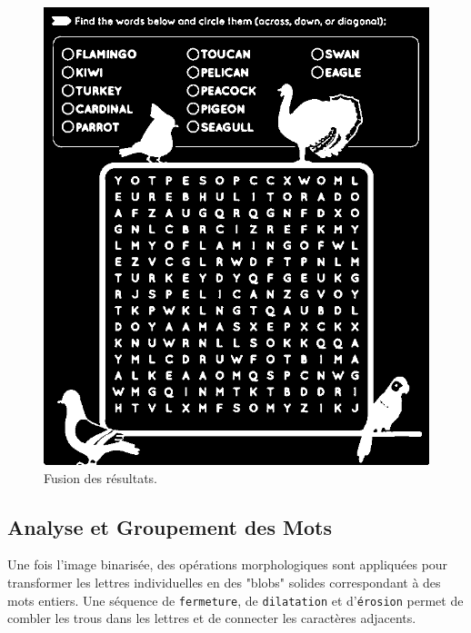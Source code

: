 \documentclass{article}
\begin{document}
\begin{figure}[H]
    \includegraphics[width=\linewidth]{ressources/3level_3_image_2_06_combined_threshold.png}
    \caption{}
  \endminipage
  \caption{Fusion des résultats.}
\end{figure}
\subsection{Analyse et Groupement des Mots}
Une fois l'image binarisée, des opérations morphologiques sont appliquées pour transformer les lettres individuelles en des "blobs" solides correspondant à des mots entiers. Une séquence de \texttt{fermeture}, de \texttt{dilatation} et d'\texttt{érosion} permet de combler les trous dans les lettres et de connecter les caractères adjacents.
\end{document}
